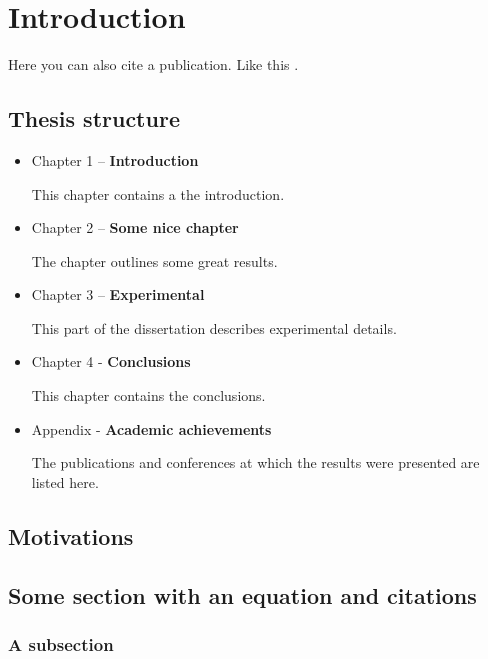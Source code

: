 \chapter{Introduction}


\lipsum[12]


Here you can also cite a publication. Like this \cite{Cie2022}.


\section{Thesis structure}

\lipsum[4]


\begin{itemize}
	\item Chapter 1 – \textbf{Introduction}
	
	This chapter contains a the introduction. 
	
	\item Chapter 2 – \textbf{Some nice chapter}
	
	The chapter outlines some great results.
	
	\item Chapter 3 – \textbf{Experimental}
	
	This part of the dissertation describes experimental details.

	\item Chapter 4 - \textbf{Conclusions}
	
	This chapter contains the conclusions.

	\item Appendix - \textbf{Academic achievements}
	
	The publications and conferences at which  the results were presented are listed here. 
\end{itemize}

\section{Motivations}

\lipsum[5-7]


\section{Some section with an equation and citations}




\subsection{A subsection}

